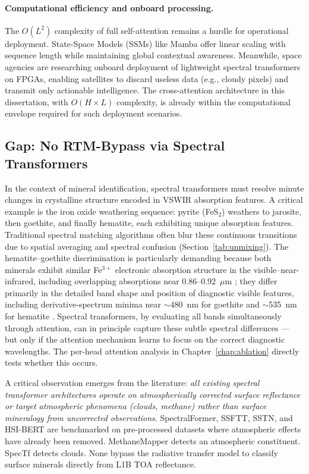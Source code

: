 \documentclass[11pt]{report}
\begin{document}
\paragraph{Computational efficiency and onboard processing.}
The $O(L^2)$ complexity of full self-attention remains a hurdle for operational deployment. State-Space Models (SSMs) like Mamba offer linear scaling with sequence length while maintaining global contextual awareness. Meanwhile, space agencies are researching onboard deployment of lightweight spectral transformers on FPGAs, enabling satellites to discard useless data (e.g., cloudy pixels) and transmit only actionable intelligence. The cross-attention architecture in this dissertation, with $O(H \times L)$ complexity, is already within the computational envelope required for such deployment scenarios.

\subsection{Gap: No RTM-Bypass via Spectral Transformers}

In the context of mineral identification, spectral transformers must resolve minute changes in crystalline structure encoded in VSWIR absorption features. A critical example is the iron oxide weathering sequence: pyrite (FeS$_2$) weathers to jarosite, then goethite, and finally hematite, each exhibiting unique absorption features. Traditional spectral matching algorithms often blur these continuous transitions due to spatial averaging and spectral confusion (Section~\ref{tab:unmixing}). The hematite--goethite discrimination is particularly demanding because both minerals exhibit similar Fe$^{3+}$ electronic absorption structure in the visible--near-infrared, including overlapping absorptions near 0.86--0.92~$\mu$m \cite{clark1999,sherman1985}; they differ primarily in the detailed band shape and position of diagnostic visible features, including derivative-spectrum minima near $\sim$480~nm for goethite and $\sim$535~nm for hematite \cite{Jiang2014AlGoethite}. Spectral transformers, by evaluating all bands simultaneously through attention, can in principle capture these subtle spectral differences --- but only if the attention mechanism learns to focus on the correct diagnostic wavelengths. The per-head attention analysis in Chapter~\ref{chap:ablation} directly tests whether this occurs.

A critical observation emerges from the literature: \emph{all existing spectral transformer architectures operate on atmospherically corrected surface reflectance or target atmospheric phenomena (clouds, methane) rather than surface mineralogy from uncorrected observations}. SpectralFormer, SSFTT, SSTN, and HSI-BERT are benchmarked on pre-processed datasets where atmospheric effects have already been removed. MethaneMapper detects an atmospheric constituent. SpecTf detects clouds. None bypass the radiative transfer model to classify surface minerals directly from L1B TOA reflectance.
\end{document}
